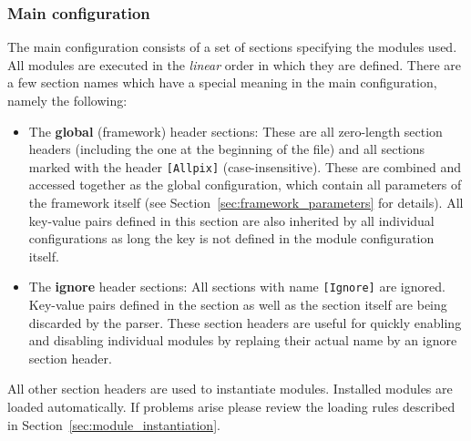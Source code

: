 \subsubsection{Main configuration}
\label{sec:main_config}
The main configuration consists of a set of sections specifying the modules used.
All modules are executed in the \emph{linear} order in which they are defined.
There are a few section names which have a special meaning in the main configuration, namely the following:
\begin{itemize}
\item The \textbf{global} (framework) header sections: These are all zero-length section headers (including the one at the beginning of the file) and all sections marked with the header \texttt{[Allpix]} (case-insensitive).
These are combined and accessed together as the global configuration, which contain all parameters of the framework itself (see Section~\ref{sec:framework_parameters} for details).
All key-value pairs defined in this section are also inherited by all individual configurations as long the key is not defined in the module configuration itself.
\item The \textbf{ignore} header sections: All sections with name \texttt{[Ignore]} are ignored.
Key-value pairs defined in the section as well as the section itself are being discarded by the parser.
These section headers are useful for quickly enabling and disabling individual modules by replaing their actual name by an ignore section header.
\end{itemize}

All other section headers are used to instantiate modules.
Installed modules are loaded automatically.
If problems arise please review the loading rules described in Section~\ref{sec:module_instantiation}.

